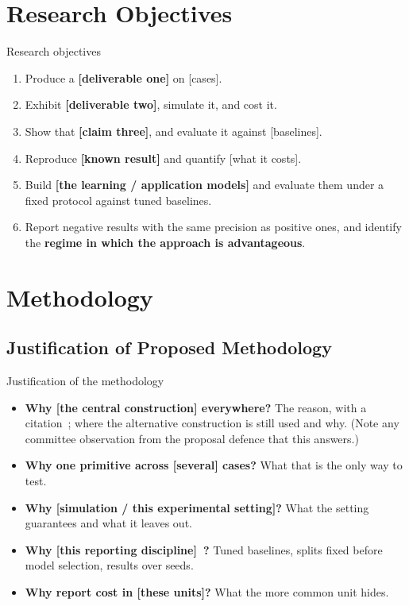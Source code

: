 \documentclass[aspectratio=43, 11pt, xcolor=dvipsnames, compress]{beamer}
\renewcommand{\cite}[2][]{\unskip}   %
\begin{document}
\section{Research Objectives}
\begin{frame}{Research objectives}
  \begin{enumerate}
    \item[\textbf{O1}] Produce a \textbf{[deliverable one]} on [cases].
    \item[\textbf{O2}] Exhibit \textbf{[deliverable two]}, simulate it, and cost it.
    \item[\textbf{O3}] Show that \textbf{[claim three]}, and evaluate it against [baselines].
    \item[\textbf{O4}] Reproduce \textbf{[known result]} and quantify [what it costs].
    \item[\textbf{O5}] Build \textbf{[the learning / application models]} and evaluate them under a fixed protocol against tuned baselines.
    \item[\textbf{O6}] Report negative results with the same precision as positive ones, and identify the \textbf{regime in which the approach is advantageous}.
  \end{enumerate}
\end{frame}

\section{Methodology}

\subsection{Justification of Proposed Methodology}
\begin{frame}{Justification of the methodology}
  \small
  \begin{itemize}
    \item \textbf{Why [the central construction] everywhere?} The reason, with a citation~\cite{example_article}; where the alternative construction is still used and why. (Note any committee observation from the proposal defence that this answers.)
    \item \textbf{Why one primitive across [several] cases?} What that is the only way to test.
    \item \textbf{Why [simulation / this experimental setting]?} What the setting guarantees and what it leaves out.
    \item \textbf{Why [this reporting discipline]~\cite{example_inproceedings}?} Tuned baselines, splits fixed before model selection, results over seeds.
    \item \textbf{Why report cost in [these units]?} What the more common unit hides.
  \end{itemize}
\end{frame}
\end{document}
